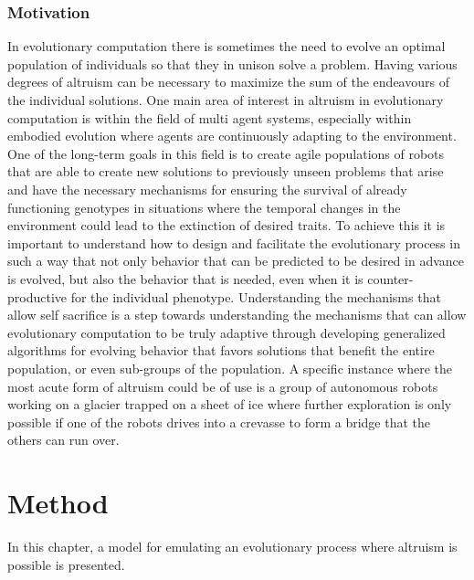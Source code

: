 \documentclass[a4paper]{book}
\begin{document}
\subsection{Motivation}
In evolutionary computation there is sometimes the need to evolve an optimal population of individuals so that they in unison solve a problem. 
Having various degrees of altruism can be necessary to maximize the sum of the endeavours of the individual solutions. 
One main area of interest in altruism in evolutionary computation is within the field of multi agent systems, especially within embodied evolution where agents are continuously adapting to the environment. One of the long-term goals in this field is to create agile populations of robots that are able to create new solutions to previously unseen problems that  arise and have the necessary mechanisms for ensuring the survival of already functioning genotypes in situations where the temporal changes in the environment could lead to the extinction of desired traits.  
To achieve this it is important to understand how to design and facilitate the evolutionary process in such a way that not only behavior that can be predicted to be desired in advance is evolved, but also the behavior that is needed, even when it is counter-productive for the individual phenotype.
Understanding the mechanisms that allow self sacrifice is a step towards understanding the mechanisms that can allow evolutionary computation to be truly adaptive through developing generalized algorithms for evolving behavior that favors solutions that benefit the entire population, or even sub-groups of the population.
A specific instance where the most acute form of altruism could be of use is a group of autonomous robots working on a  glacier trapped on a sheet of ice where further exploration is only possible if one of the robots drives into a crevasse to form a bridge that the others can run over.    


\chapter{Method}
\label{cha:model}

In this chapter, a model for emulating an evolutionary process where altruism is possible is presented.
\end{document}
